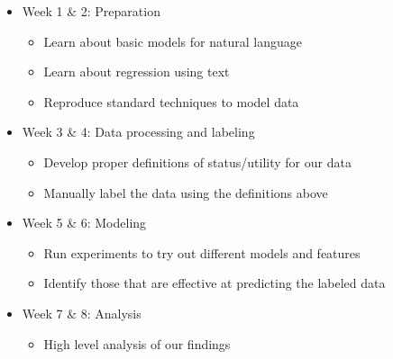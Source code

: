 \documentclass[dvips,12pt]{article}
\begin{document}
\begin{itemize}
	
	\item Week 1 \& 2: Preparation
	\begin{itemize}
		\item Learn about basic models for natural language
		\item Learn about regression using text			
		\item Reproduce standard techniques to model data
	\end{itemize}
	
	\item Week 3 \& 4: Data processing and labeling
	\begin{itemize}
		\item Develop proper definitions of status/utility for our data
		\item Manually label the data using the definitions above
	\end{itemize}
	
	\item Week 5 \& 6: Modeling
	\begin{itemize}
		\item Run experiments to try out different models and features
		\item Identify those that are effective at predicting the labeled data
	\end{itemize}
	
	\item Week 7 \& 8: Analysis
	\begin{itemize}
		\item High level analysis of our findings
	\end{itemize}
\end{itemize}




{}


\end{document}
